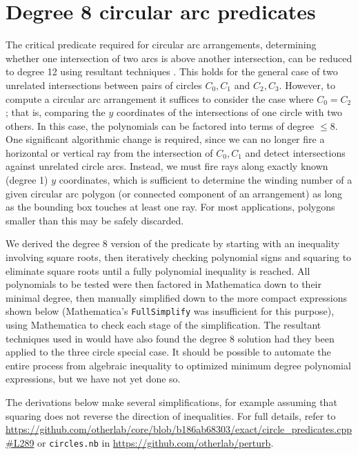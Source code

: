 \documentclass[11pt]{article}
\begin{document}
\section{Degree 8 circular arc predicates} \label{sec:predicates}

The critical predicate required for circular arc arrangements, determining whether one intersection of two arcs is above another intersection,
can be reduced to degree 12 using resultant techniques \cite{devillers2000algebraic}.  This holds for the general case of two unrelated intersections between pairs of circles
$C_0,C_1$ and $C_2,C_3$.  However, to compute a circular arc arrangement it suffices to consider the case where $C_0 = C_2$; that is, comparing the $y$ coordinates of the
intersections of one circle with two others.  In this case, the polynomials can be factored into terms of degree $\le 8$.  One significant algorithmic change is required,
since we can no longer fire a horizontal or vertical ray from the intersection of $C_0,C_1$ and detect intersections against unrelated circle arcs.  Instead, we must fire
rays along exactly known (degree 1) $y$ coordinates, which is sufficient to determine the winding number of a given circular arc polygon (or connected component of an arrangement)
as long as the bounding box touches at least one ray.  For most applications, polygons smaller than this may be safely discarded.

We derived the degree 8 version of the predicate by starting with an inequality involving square roots, then iteratively checking polynomial signs and squaring to eliminate
square roots until a fully polynomial inequality is reached.  All polynomials to be tested were then factored in Mathematica down to their minimal degree, then manually simplified
down to the more compact expressions shown below (Mathematica's \verb+FullSimplify+ was insufficient for this purpose), using Mathematica to check each stage of the simplification.
The resultant techniques used in \cite{devillers2000algebraic} would have also found the degree 8 solution had they been applied to the three circle special case.  It should be possible
to automate the entire process from algebraic inequality to optimized minimum degree polynomial expressions, but we have not yet done so.

The derivations below make several simplifications, for example assuming that squaring does not reverse the direction of inequalities.  For full details, refer to
\url{https://github.com/otherlab/core/blob/b186ab68303/exact/circle_predicates.cpp#L289} or \verb+circles.nb+ in \url{https://github.com/otherlab/perturb}.
\end{document}
